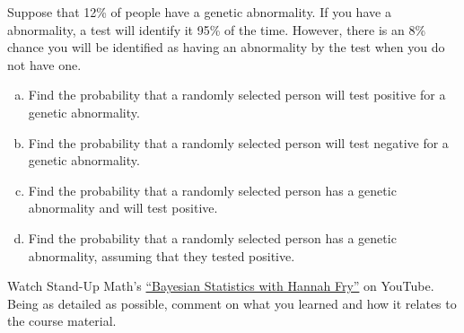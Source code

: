\documentclass[11pt,letterpaper]{article}
\begin{document}
\newpage



 Suppose that 12\% of people have a genetic abnormality. If you have a abnormality, a test will identify it 95\% of the time. However, there is an 8\% chance you will be identified as having an abnormality by the test when you do not have one. 
	\begin{enumerate}[(a)]
	\item Find the probability that a randomly selected person will test positive for a genetic abnormality. 
	\item Find the probability that a randomly selected person will test negative for a genetic abnormality. 
	\item Find the probability that a randomly selected person has a genetic abnormality and will test positive. 
	\item Find the probability that a randomly selected person has a genetic abnormality, assuming that they tested positive. 
	\end{enumerate}



\newpage



 Watch Stand-Up Math's \href{https://www.youtube.com/watch?v=7GgLSnQ48os&pp=ygUjQmF5ZXNpYW4gU3RhdGlzdGljcyB3aXRoIEhhbm5haCBGcnk\%3D}{``Bayesian Statistics with Hannah Fry''} on YouTube. Being as detailed as possible, comment on what you learned and how it relates to the course material. 
\end{document}
